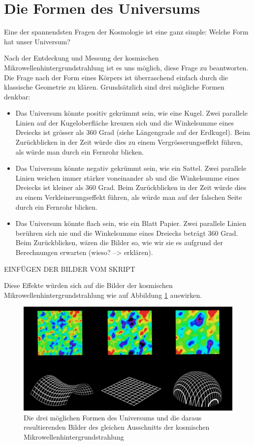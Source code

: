 \section{Die Formen des Universums}
Eine der spannendsten Fragen der Kosmologie ist eine ganz simple: Welche Form 
hat unser Universum?

Nach der Entdeckung und Messung der kosmischen Mikrowellenhintergrundstrahlung 
ist es uns möglich, diese Frage zu beantworten.
Die Frage nach der Form eines Körpers ist überraschend einfach durch die 
klassische Geometrie zu klären.
Grundsätzlich sind drei mögliche Formen denkbar:
\begin{itemize}
	\item Das Universum könnte positiv gekrümmt sein, wie eine Kugel.
	Zwei parallele Linien auf der Kugeloberfläche kreuzen sich und die 
	Winkelsumme eines Dreiecks ist grösser als 360 Grad (siehe Längengrade auf der Erdkugel).
	Beim Zurückblicken in der Zeit würde dies zu einem Vergrösserungseffekt führen,
	als würde man durch ein Fernrohr blicken.
	\item Das Universum könnte negativ gekrümmt sein, wie ein Sattel.
	Zwei parallele Linien weichen immer stärker voneinander ab und die 
	Winkelsumme eines Dreiecks ist kleiner als 360 Grad.
	Beim Zurückblicken in der Zeit würde dies zu einem Verkleinerungseffekt führen,
	als würde man auf der falschen Seite durch ein Fernrohr blicken.
	\item Das Universum könnte flach sein, wie ein Blatt Papier.
	Zwei parallele Linien berühren sich nie und die Winkelsumme eines Dreiecks 
	beträgt 360 Grad.
	Beim Zurückblicken, wären die Bilder so, wie wir sie es aufgrund der Berechnungen erwarten (wieso? --> erklären).
\end{itemize}
EINFÜGEN DER BILDER VOM SKRIPT

Diese Effekte würden sich auf die Bilder der kosmischen Mikrowellenhintergrundstrahlung
wie auf Abbildung \ref{fig:universe_shapes} auswirken.

\begin{figure}
	\includegraphics[width=\linewidth]{cmb/images/universe_shapes.jpg}
	\caption{Die drei möglichen Formen des Universums und die daraus 
		resultierenden Bilder des gleichen Ausschnitts der kosmischen
		Mikrowellenhintergrundstrahlung}
	\label{fig:universe_shapes}
\end{figure}